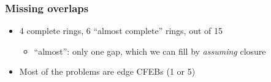 \documentclass[compress]{beamer}
\begin{document}
\begin{frame}
\frametitle{Missing overlaps}


\begin{itemize}
\item 4 complete rings, 6 ``almost complete'' rings, out of 15
\begin{itemize}
\item ``almost'': only one gap, which we can fill by {\it assuming} closure
\end{itemize}

\item<2> Most of the problems are edge CFEBs (1 or 5)
\end{itemize}
\end{frame}
\end{document}
